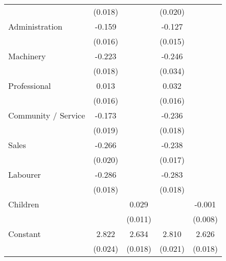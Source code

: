 {\begin{tabular}{l*{4}{c}}
                    &     (0.018)         &                     &     (0.020)         &                     \\
[1em]
Administration      &      -0.159\sym{***}&                     &      -0.127\sym{***}&                     \\
                    &     (0.016)         &                     &     (0.015)         &                     \\
[1em]
Machinery           &      -0.223\sym{***}&                     &      -0.246\sym{***}&                     \\
                    &     (0.018)         &                     &     (0.034)         &                     \\
[1em]
Professional        &       0.013         &                     &       0.032\sym{*}  &                     \\
                    &     (0.016)         &                     &     (0.016)         &                     \\
[1em]
Community / Service &      -0.173\sym{***}&                     &      -0.236\sym{***}&                     \\
                    &     (0.019)         &                     &     (0.018)         &                     \\
[1em]
Sales               &      -0.266\sym{***}&                     &      -0.238\sym{***}&                     \\
                    &     (0.020)         &                     &     (0.017)         &                     \\
[1em]
Labourer            &      -0.286\sym{***}&                     &      -0.283\sym{***}&                     \\
                    &     (0.018)         &                     &     (0.018)         &                     \\
[1em]
Children            &                     &       0.029\sym{**} &                     &      -0.001         \\
                    &                     &     (0.011)         &                     &     (0.008)         \\
[1em]
Constant            &       2.822\sym{***}&       2.634\sym{***}&       2.810\sym{***}&       2.626\sym{***}\\
                    &     (0.024)         &     (0.018)         &     (0.021)         &     (0.018)         \\

\end{tabular}}
